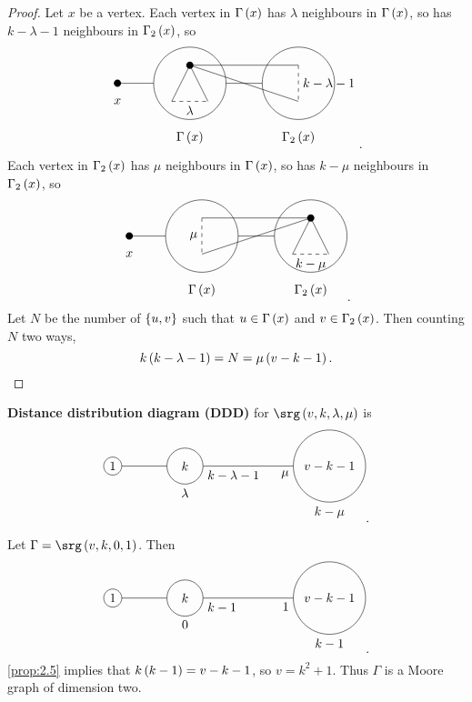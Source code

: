 \begin{proof}
Let $ x $ be a vertex. Each vertex in $ \Gamma\br{x} $ has $ \lambda $ neighbours in $ \Gamma\br{x} $, so has $ k - \lambda - 1 $ neighbours in $ \Gamma_2\br{x} $, so
$$
\begin{tikzpicture}
\fill (0, 0) circle (0.1);
\draw (0, -0.5) node{$ x $};
\draw (2, 0) circle (1);
\draw (2, -1.5) node{$ \Gamma\br{x} $};
\draw (5, 0) circle (1);
\draw (5, -1.5) node{$ \Gamma_2\br{x} $};
\draw (0, 0) to (1, 0);
\draw (3, 0) to (4, 0);
\fill (2, 0.5) circle (0.1);
\draw (2, 0.5) to (1.5, -0.5);
\draw (2, 0.5) to (2.5, -0.5);
\draw [dashed] (1.5, -0.5) to node[below]{$ \lambda $} (2.5, -0.5);
\draw (2, 0.5) to (5, 0.5);
\draw (2, 0.5) to (5, -0.5);
\draw [dashed] (5, 0.5) to node[right]{$ k - \lambda - 1 $} (5, -0.5);
\end{tikzpicture}.
$$
Each vertex in $ \Gamma_2\br{x} $ has $ \mu $ neighbours in $ \Gamma\br{x} $, so has $ k - \mu $ neighbours in $ \Gamma_2\br{x} $, so
$$
\begin{tikzpicture}
\fill (0, 0) circle (0.1);
\draw (0, -0.5) node{$ x $};
\draw (2, 0) circle (1);
\draw (2, -1.5) node{$ \Gamma\br{x} $};
\draw (5, 0) circle (1);
\draw (5, -1.5) node{$ \Gamma_2\br{x} $};
\draw (0, 0) to (1, 0);
\draw (3, 0) to (4, 0);
\fill (5, 0.5) circle (0.1);
\draw (5, 0.5) to (4.5, -0.5);
\draw (5, 0.5) to (5.5, -0.5);
\draw [dashed] (4.5, -0.5) to node[below]{$ k - \mu $} (5.5, -0.5);
\draw (5, 0.5) to (2, 0.5);
\draw (5, 0.5) to (2, -0.5);
\draw [dashed] (2, 0.5) to node[left]{$ \mu $} (2, -0.5);
\end{tikzpicture}.
$$
Let $ N $ be the number of $ \cbr{u, v} $ such that $ u \in \Gamma\br{x} $ and $ v \in \Gamma_2\br{x} $. Then counting $ N $ two ways,
$$ k\br{k - \lambda - 1} = N = \mu\br{v - k - 1}. $$
\end{proof}


\textbf{Distance distribution diagram (DDD)} for $ \srg\br{v, k, \lambda, \mu} $ is
$$
\begin{tikzpicture}
\draw (0, 0) circle (0.25) node{$ 1 $};
\draw (2, 0) circle (0.5) node{$ k $};
\draw (6, 0) circle (1) node{$ v - k - 1 $};
\draw (0.25, 0) to (1.5, 0);
\draw (2.5, 0) node[below right]{$ k - \lambda - 1 $} to (5, 0) node[below left]{$ \mu $};
\draw (2, -0.5) node[below]{$ \lambda $};
\draw (6, -1) node[below]{$ k - \mu $};
\end{tikzpicture}.
$$

\begin{example*}
Let $ \Gamma = \srg\br{v, k, 0, 1} $. Then
$$
\begin{tikzpicture}
\draw (0, 0) circle (0.25) node{$ 1 $};
\draw (2, 0) circle (0.5) node{$ k $};
\draw (6, 0) circle (1) node{$ v - k - 1 $};
\draw (0.25, 0) to (1.5, 0);
\draw (2.5, 0) node[below right]{$ k - 1 $} to (5, 0) node[below left]{$ 1 $};
\draw (2, -0.5) node[below]{$ 0 $};
\draw (6, -1) node[below]{$ k - 1 $};
\end{tikzpicture}.
$$
\ref{prop:2.5} implies that $ k\br{k - 1} = v - k - 1 $, so $ v = k^2 + 1 $. Thus $ \Gamma $ is a Moore graph of dimension two.
\end{example*}

